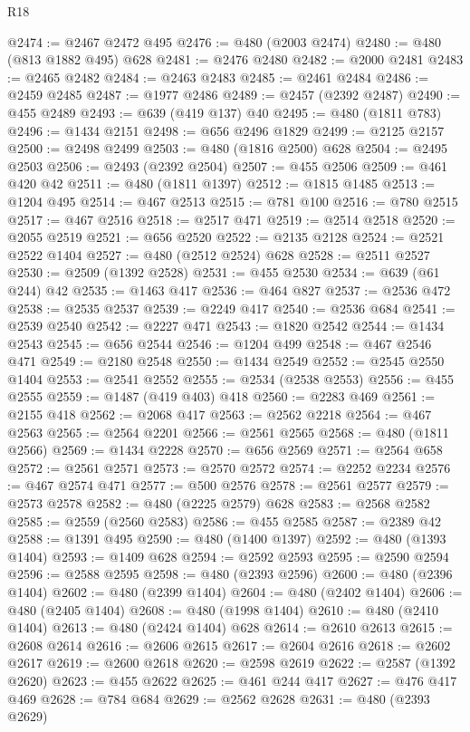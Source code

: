 \begin{lexlean}{R18}
\begin{coremodule}
@2474 := @2467 @2472 @495
@2476 := @480 (@2003 @2474)
@2480 := @480 (@813 @1882 @495) @628
@2481 := @2476 @2480
@2482 := @2000 @2481
@2483 := @2465 @2482
@2484 := @2463 @2483
@2485 := @2461 @2484
@2486 := @2459 @2485
@2487 := @1977 @2486
@2489 := @2457 (@2392 @2487)
@2490 := @455 @2489
@2493 := @639 (@419 @137) @40
@2495 := @480 (@1811 @783)
@2496 := @1434 @2151
@2498 := @656 @2496 @1829
@2499 := @2125 @2157
@2500 := @2498 @2499
@2503 := @480 (@1816 @2500) @628
@2504 := @2495 @2503
@2506 := @2493 (@2392 @2504)
@2507 := @455 @2506
@2509 := @461 @420 @42
@2511 := @480 (@1811 @1397)
@2512 := @1815 @1485
@2513 := @1204 @495
@2514 := @467 @2513
@2515 := @781 @100
@2516 := @780 @2515
@2517 := @467 @2516
@2518 := @2517 @471
@2519 := @2514 @2518
@2520 := @2055 @2519
@2521 := @656 @2520
@2522 := @2135 @2128
@2524 := @2521 @2522 @1404
@2527 := @480 (@2512 @2524) @628
@2528 := @2511 @2527
@2530 := @2509 (@1392 @2528)
@2531 := @455 @2530
@2534 := @639 (@61 @244) @42
@2535 := @1463 @417
@2536 := @464 @827
@2537 := @2536 @472
@2538 := @2535 @2537
@2539 := @2249 @417
@2540 := @2536 @684
@2541 := @2539 @2540
@2542 := @2227 @471
@2543 := @1820 @2542
@2544 := @1434 @2543
@2545 := @656 @2544
@2546 := @1204 @499
@2548 := @467 @2546 @471
@2549 := @2180 @2548
@2550 := @1434 @2549
@2552 := @2545 @2550 @1404
@2553 := @2541 @2552
@2555 := @2534 (@2538 @2553)
@2556 := @455 @2555
@2559 := @1487 (@419 @403) @418
@2560 := @2283 @469
@2561 := @2155 @418
@2562 := @2068 @417
@2563 := @2562 @2218
@2564 := @467 @2563
@2565 := @2564 @2201
@2566 := @2561 @2565
@2568 := @480 (@1811 @2566)
@2569 := @1434 @2228
@2570 := @656 @2569
@2571 := @2564 @658
@2572 := @2561 @2571
@2573 := @2570 @2572
@2574 := @2252 @2234
@2576 := @467 @2574 @471
@2577 := @500 @2576
@2578 := @2561 @2577
@2579 := @2573 @2578
@2582 := @480 (@2225 @2579) @628
@2583 := @2568 @2582
@2585 := @2559 (@2560 @2583)
@2586 := @455 @2585
@2587 := @2389 @42
@2588 := @1391 @495
@2590 := @480 (@1400 @1397)
@2592 := @480 (@1393 @1404)
@2593 := @1409 @628
@2594 := @2592 @2593
@2595 := @2590 @2594
@2596 := @2588 @2595
@2598 := @480 (@2393 @2596)
@2600 := @480 (@2396 @1404)
@2602 := @480 (@2399 @1404)
@2604 := @480 (@2402 @1404)
@2606 := @480 (@2405 @1404)
@2608 := @480 (@1998 @1404)
@2610 := @480 (@2410 @1404)
@2613 := @480 (@2424 @1404) @628
@2614 := @2610 @2613
@2615 := @2608 @2614
@2616 := @2606 @2615
@2617 := @2604 @2616
@2618 := @2602 @2617
@2619 := @2600 @2618
@2620 := @2598 @2619
@2622 := @2587 (@1392 @2620)
@2623 := @455 @2622
@2625 := @461 @244 @417
@2627 := @476 @417 @469
@2628 := @784 @684
@2629 := @2562 @2628
@2631 := @480 (@2393 @2629)

\end{coremodule}
\end{lexlean}
